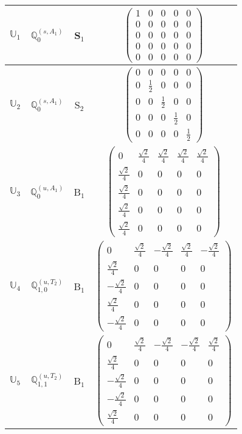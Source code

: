 \documentclass[fleqn,10pt,landscape]{article}
\begin{document}
\begin{itemize}
\begin{center}
\begin{longtable}{c|c|c|c}
$ \mathbb{U}_{1} $ & $\mathbb{Q}_{0}^{(s,A_{1})}$ & S$_{1}$ & $\begin{pmatrix} 1 & 0 & 0 & 0 & 0 \\ 0 & 0 & 0 & 0 & 0 \\ 0 & 0 & 0 & 0 & 0 \\ 0 & 0 & 0 & 0 & 0 \\ 0 & 0 & 0 & 0 & 0 \end{pmatrix}$ \\ \hline
$ \mathbb{U}_{2} $ & $\mathbb{Q}_{0}^{(s,A_{1})}$ & S$_{2}$ & $\begin{pmatrix} 0 & 0 & 0 & 0 & 0 \\ 0 & \frac{1}{2} & 0 & 0 & 0 \\ 0 & 0 & \frac{1}{2} & 0 & 0 \\ 0 & 0 & 0 & \frac{1}{2} & 0 \\ 0 & 0 & 0 & 0 & \frac{1}{2} \end{pmatrix}$ \\ \hline
$ \mathbb{U}_{3} $ & $\mathbb{Q}_{0}^{(u,A_{1})}$ & B$_{1}$ & $\begin{pmatrix} 0 & \frac{\sqrt{2}}{4} & \frac{\sqrt{2}}{4} & \frac{\sqrt{2}}{4} & \frac{\sqrt{2}}{4} \\ \frac{\sqrt{2}}{4} & 0 & 0 & 0 & 0 \\ \frac{\sqrt{2}}{4} & 0 & 0 & 0 & 0 \\ \frac{\sqrt{2}}{4} & 0 & 0 & 0 & 0 \\ \frac{\sqrt{2}}{4} & 0 & 0 & 0 & 0 \end{pmatrix}$ \\
$ \mathbb{U}_{4} $ & $\mathbb{Q}_{1,0}^{(u,T_{2})}$ & B$_{1}$ & $\begin{pmatrix} 0 & \frac{\sqrt{2}}{4} & - \frac{\sqrt{2}}{4} & \frac{\sqrt{2}}{4} & - \frac{\sqrt{2}}{4} \\ \frac{\sqrt{2}}{4} & 0 & 0 & 0 & 0 \\ - \frac{\sqrt{2}}{4} & 0 & 0 & 0 & 0 \\ \frac{\sqrt{2}}{4} & 0 & 0 & 0 & 0 \\ - \frac{\sqrt{2}}{4} & 0 & 0 & 0 & 0 \end{pmatrix}$ \\
$ \mathbb{U}_{5} $ & $\mathbb{Q}_{1,1}^{(u,T_{2})}$ & B$_{1}$ & $\begin{pmatrix} 0 & \frac{\sqrt{2}}{4} & - \frac{\sqrt{2}}{4} & - \frac{\sqrt{2}}{4} & \frac{\sqrt{2}}{4} \\ \frac{\sqrt{2}}{4} & 0 & 0 & 0 & 0 \\ - \frac{\sqrt{2}}{4} & 0 & 0 & 0 & 0 \\ - \frac{\sqrt{2}}{4} & 0 & 0 & 0 & 0 \\ \frac{\sqrt{2}}{4} & 0 & 0 & 0 & 0 \end{pmatrix}$ \\

\end{longtable}
\end{center}
\end{itemize}
\end{document}
